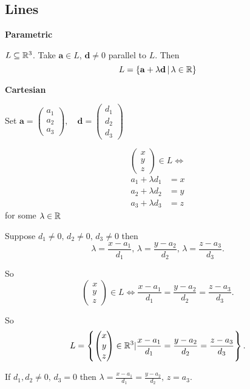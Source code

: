 \documentclass[10pt, a4paper]{article}
\newcommand{\mbf}[1]{\mathbf{#1}}
\begin{document}
\subsection{Lines}

\textbf{Parametric}

$L \subseteq \mathbb{R} ^ 3$. Take $\mbf{a} \in L$, $\mbf{d} \neq 0$ parallel to $L$. Then
\[
L = \{\mbf{a} +\lambda\mbf{d}\,|\, \lambda \in \R\}
\]

\textbf{Cartesian}

Set $\mbf{a} = \begin{pmatrix}
    a_1 \\ a_2 \\ a_3
\end{pmatrix},\quad\mbf{d} = \begin{pmatrix}
    d_1 \\ d_2 \\ d_3
\end{pmatrix}$


\[
\begin{pmatrix}
    x \\ y \\ z
\end{pmatrix} \in L \iff
\]
\begin{align*}
    a_1 + \lambda d_1 &= x \\
    a_2 + \lambda d_2 &= y \\
    a_3 + \lambda d_3 &= z
\end{align*}
for some $\lambda \in \mathbb{R}$

Suppose $d_1 \neq 0,\, d_2 \neq 0,\,d_3 \neq 0$ then
\[
\lambda = \frac{x - a_1}{d_1},\,\lambda = \frac{y - a_2}{d_2},\,\lambda = \frac{z - a_3}{d_3}.
\]

So
\[
\begin{pmatrix}
    x \\ y \\ z
\end{pmatrix} \in L \iff
\frac{x - a_1}{d_1} = \frac{y - a_2}{d_2} = \frac{z - a_3}{d_3}.
\]

So 
\[
L = \left\{\begin{pmatrix}
    x \\ y \\ z
\end{pmatrix} \in \mathbb{R} ^ 3 | \frac{x - a_1}{d_1} = \frac{y - a_2}{d_2} = \frac{z - a_3}{d_3}\right\}.
\]

If $d_1, d_2 \neq 0,\,d_3 = 0$ then $\lambda = \frac{x - a_1}{d_1} = \frac{y - a_2}{d_2},\, z = a_3$.
\end{document}

